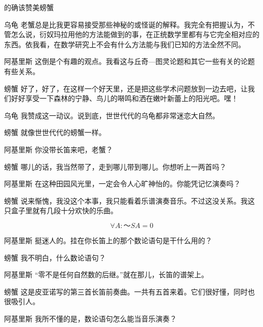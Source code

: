 \begin{dialog}{的确该赞美螃蟹}
\begin{dialogue}
\item[乌龟]老蟹总是比我更容易接受那些神秘的或怪诞的解释。我完全有把握认为，不管怎么说，衍奴玛拉用他的方法能做到的事，在正统数学里都有与它完全相对应的东西。依我看，在数学研究上不会有什么方法能与我们已知的方法全然不同。

\item[阿基里斯]这倒是个有趣的观点。我看这与丘奇—图灵论题和其它一些有关的论题有些关系。

\item[螃蟹]好了，好了，在这样一个好天里，还是把这些学术问题放到一边去吧，让我们好好享受一下森林的宁静、鸟儿的啭鸣和洒在嫩叶新蕾上的阳光吧。嘿！

\item[乌龟]我赞成这一动议。说到底，世世代代的乌龟都非常迷恋大自然。

\item[螃蟹]就像世世代代的螃蟹一样。

\item[阿基里斯]你没带长笛来吧，老蟹？

\item[螃蟹]哪儿的话，我当然带了，走到哪儿带到哪儿。你想听上一两首吗？

\item[阿基里斯]在这种田园风光里，一定会令人心旷神怡的。你能凭记忆演奏吗？

\item[螃蟹]说来惭愧，我没这个本事，我只能看着乐谱演奏音乐。不过这没关系。我这只盒子里就有几段十分欢快的乐曲。

\[
\forall A:～SA=0
\]

\item[阿基里斯]挺迷人的。挂在你长笛上的那个数论语句是干什么用的？

\item[螃蟹]我不明白，什么数论语句？

\item[阿基里斯]“零不是任何自然数的后继。”就在那儿，长笛的谱架上。

\item[螃蟹]这是皮亚诺写的第三首长笛前奏曲。一共有五首来着。它们很好懂，同时也很吸引人。

\item[阿基里斯]我所不懂的是，数论语句怎么能当音乐演奏？


\end{dialogue}
\end{dialog}
